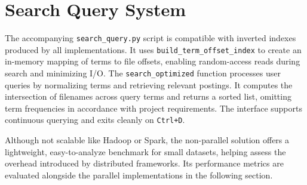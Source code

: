 \section{Search Query System}
The accompanying \texttt{search\_query.py} script is compatible with inverted indexes produced by all implementations. It uses \texttt{build\_term\_offset\_index} to create an in-memory mapping of terms to file offsets, enabling random-access reads during search and minimizing I/O. The \texttt{search\_optimized} function processes user queries by normalizing terms and retrieving relevant postings. It computes the intersection of filenames across query terms and returns a sorted list, omitting term frequencies in accordance with project requirements. The interface supports continuous querying and exits cleanly on \texttt{Ctrl+D}.

Although not scalable like Hadoop or Spark, the non-parallel solution offers a lightweight, easy-to-analyze benchmark for small datasets, helping assess the overhead introduced by distributed frameworks. Its performance metrics are evaluated alongside the parallel implementations in the following section.